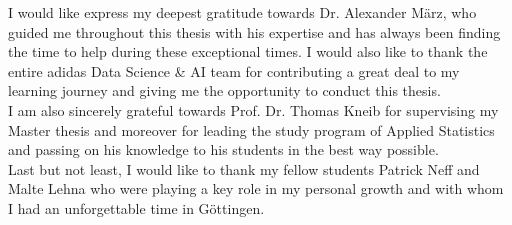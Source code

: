 
\vspace{2cm}



I would like express my deepest gratitude towards Dr. Alexander März, who guided me throughout this thesis with his expertise and has always been finding the time to help during these exceptional times. I would also like to thank the entire adidas Data Science \& AI team for contributing a great deal to my learning journey and giving me the opportunity to conduct this thesis.\\
I am also sincerely grateful towards Prof. Dr. Thomas Kneib for supervising my Master thesis and moreover for leading the study program of Applied Statistics and passing on his knowledge to his students in the best way possible.\\
Last but not least, I would like to thank my fellow students Patrick Neff and Malte Lehna who were playing a key role in my personal growth and with whom I had an unforgettable time in Göttingen. 

\vspace{1cm}


\textbf{}


